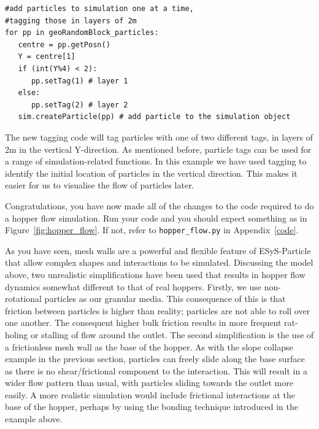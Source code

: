 \begin{enumerate}
\begin{verbatim}
#add particles to simulation one at a time,
#tagging those in layers of 2m
for pp in geoRandomBlock_particles:
   centre = pp.getPosn()
   Y = centre[1]
   if (int(Y%4) < 2):
      pp.setTag(1) # layer 1
   else:
      pp.setTag(2) # layer 2
   sim.createParticle(pp) # add particle to the simulation object
\end{verbatim}

The new tagging code will tag particles with one of two different tags, in layers of 2m in the vertical Y-direction.  As mentioned before, particle tags can be used for a range of simulation-related functions.  In this example we have used tagging to identify the initial location of particles in the vertical direction. This makes it easier for us to visualise the flow of particles later.
\end{enumerate}

Congratulations, you have now made all of the changes to the code required to do a hopper flow simulation. Run your code and you should expect something as in Figure~\ref{fig:hopper_flow}. If not, refer to \texttt{hopper\_flow.py} in Appendix~\ref{code}.

As you have seen, mesh walls are a powerful and flexible feature of ESyS-Particle that allow complex shapes and interactions to be simulated. Discussing the model above, two unrealistic simplifications have been used that results in hopper flow dynamics somewhat different to that of real hoppers. Firstly, we use non-rotational particles as our granular media. This consequence of this is that friction between particles is higher than reality; particles are not able to roll over one another. The consequent higher bulk friction results in more frequent rat-holing or stalling of flow around the outlet. The second simplification is the use of a frictionless mesh wall as the base of the hopper. As with the slope collapse example in the previous section, particles can freely slide along the base surface as there is no shear/frictional component to the interaction. This will result in a wider flow pattern than usual, with particles sliding towards the outlet more easily. A more realistic simulation would include 
frictional interactions at the base of the hopper, perhaps by using the bonding technique introduced in the example above.

